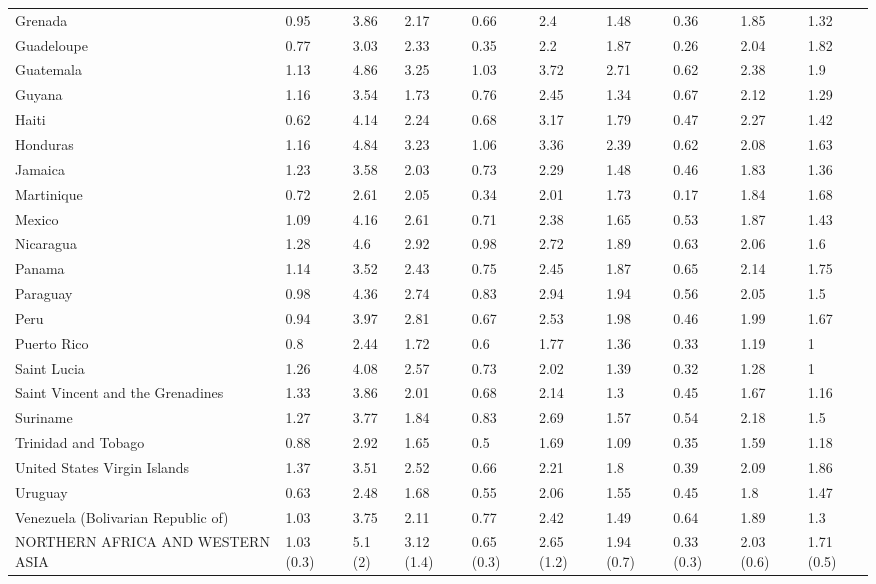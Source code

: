 \begin{longtable}[t]{llllllllll}
Grenada & 0.95 & 3.86 & 2.17 & 0.66 & 2.4 & 1.48 & 0.36 & 1.85 & 1.32\\
Guadeloupe & 0.77 & 3.03 & 2.33 & 0.35 & 2.2 & 1.87 & 0.26 & 2.04 & 1.82\\
Guatemala & 1.13 & 4.86 & 3.25 & 1.03 & 3.72 & 2.71 & 0.62 & 2.38 & 1.9\\
Guyana & 1.16 & 3.54 & 1.73 & 0.76 & 2.45 & 1.34 & 0.67 & 2.12 & 1.29\\
Haiti & 0.62 & 4.14 & 2.24 & 0.68 & 3.17 & 1.79 & 0.47 & 2.27 & 1.42\\
Honduras & 1.16 & 4.84 & 3.23 & 1.06 & 3.36 & 2.39 & 0.62 & 2.08 & 1.63\\
Jamaica & 1.23 & 3.58 & 2.03 & 0.73 & 2.29 & 1.48 & 0.46 & 1.83 & 1.36\\
Martinique & 0.72 & 2.61 & 2.05 & 0.34 & 2.01 & 1.73 & 0.17 & 1.84 & 1.68\\
Mexico & 1.09 & 4.16 & 2.61 & 0.71 & 2.38 & 1.65 & 0.53 & 1.87 & 1.43\\
Nicaragua & 1.28 & 4.6 & 2.92 & 0.98 & 2.72 & 1.89 & 0.63 & 2.06 & 1.6\\
Panama & 1.14 & 3.52 & 2.43 & 0.75 & 2.45 & 1.87 & 0.65 & 2.14 & 1.75\\
Paraguay & 0.98 & 4.36 & 2.74 & 0.83 & 2.94 & 1.94 & 0.56 & 2.05 & 1.5\\
Peru & 0.94 & 3.97 & 2.81 & 0.67 & 2.53 & 1.98 & 0.46 & 1.99 & 1.67\\
Puerto Rico & 0.8 & 2.44 & 1.72 & 0.6 & 1.77 & 1.36 & 0.33 & 1.19 & 1\\
Saint Lucia & 1.26 & 4.08 & 2.57 & 0.73 & 2.02 & 1.39 & 0.32 & 1.28 & 1\\
Saint Vincent and the Grenadines & 1.33 & 3.86 & 2.01 & 0.68 & 2.14 & 1.3 & 0.45 & 1.67 & 1.16\\
Suriname & 1.27 & 3.77 & 1.84 & 0.83 & 2.69 & 1.57 & 0.54 & 2.18 & 1.5\\
Trinidad and Tobago & 0.88 & 2.92 & 1.65 & 0.5 & 1.69 & 1.09 & 0.35 & 1.59 & 1.18\\
United States Virgin Islands & 1.37 & 3.51 & 2.52 & 0.66 & 2.21 & 1.8 & 0.39 & 2.09 & 1.86\\
Uruguay & 0.63 & 2.48 & 1.68 & 0.55 & 2.06 & 1.55 & 0.45 & 1.8 & 1.47\\
Venezuela (Bolivarian Republic of) & 1.03 & 3.75 & 2.11 & 0.77 & 2.42 & 1.49 & 0.64 & 1.89 & 1.3\\
NORTHERN AFRICA AND WESTERN ASIA & 1.03 (0.3) & 5.1 (2) & 3.12 (1.4) & 0.65 (0.3) & 2.65 (1.2) & 1.94 (0.7) & 0.33 (0.3) & 2.03 (0.6) & 1.71 (0.5)\\

\end{longtable}
